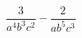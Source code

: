 \begin{ex}
	\begin{condition}
		\( \dfrac{3}{a^4b^3c^2}-\dfrac{2}{ab^5c^3} \)
	\end{condition}
\end{ex}